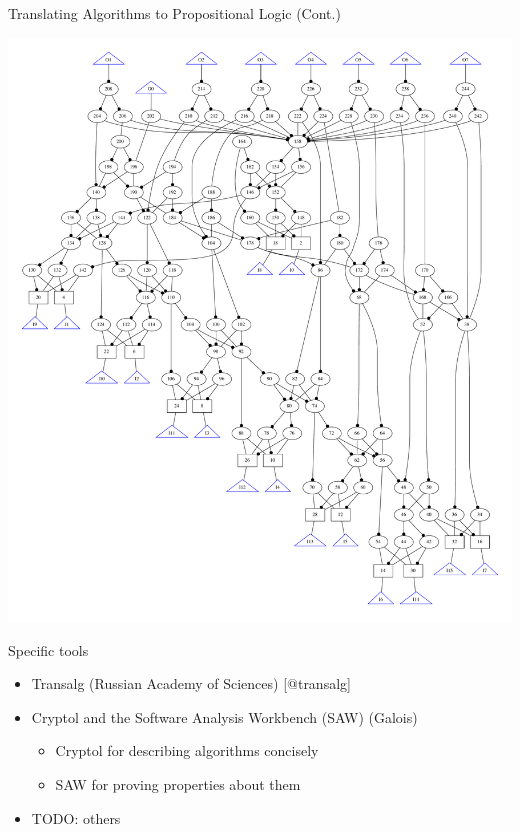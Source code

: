 \documentclass[ignorenonframetext,]{beamer}
\providecommand{\tightlist}{%
  \setlength{\itemsep}{0pt}\setlength{\parskip}{0pt}}
\begin{document}
\begin{frame}{Translating Algorithms to Propositional Logic (Cont.)}

\begin{center}
\includegraphics[height=0.8\textheight]{images/addm.pdf}
\end{center}

\end{frame}

\begin{frame}{Specific tools}

\begin{itemize}
\tightlist
\item
  Transalg (Russian Academy of Sciences) {[}@transalg{]}
\item
  Cryptol and the Software Analysis Workbench (SAW) (Galois)

  \begin{itemize}
  \tightlist
  \item
    Cryptol for describing algorithms concisely
  \item
    SAW for proving properties about them
  \end{itemize}
\item
  TODO: others
\end{itemize}

\end{frame}
\end{document}
